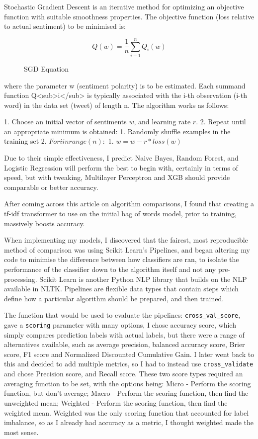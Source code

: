 \documentclass{article}
\begin{document}
Stochastic Gradient Descent is an iterative method for optimizing an objective function with suitable smoothness properties.
The objective function (loss relative to actual sentiment) to be minimised is:

\begin{figure}[H]
	\begin{equation}
		Q(w) = \frac{1}{n}\sum_{i-1}^{n}Q_i(w)
	\end{equation}
	\caption{SGD Equation}
\end{figure}

where the parameter w (sentiment polarity) is to be estimated.
Each summand function Q<sub>i</sub> is typically associated with the i-th observation (i-th word) in the data set (tweet) of length n.
The algorithm works as follows:

1.
Choose an initial vector of sentiments $w$, and learning rate $r$.
2.
Repeat until an appropriate minimum is obtained:
1.
Randomly shuffle examples in the training set
2.
$For i in range(n):$
1.
$w = w - r*loss(w)$

Due to their simple effectiveness, I predict Naive Bayes, Random Forest, and Logistic Regression will perform the best to begin with, certainly in terms of speed, but with tweaking, Multilayer Perceptron and XGB should provide comparable or better accuracy.

After coming across this article on algorithm comparisons, I found that creating a tf-idf transformer to use on the initial bag of words model, prior to training, massively boosts accuracy.

When implementing my models, I discovered that the fairest, most reproducible method of comparison was using Scikit Learn's Pipelines, and began altering my code to minimise the difference between how classifiers are ran, to isolate the performance of the classifier down to the algorithm itself and not any pre-processing.
Scikit Learn is another Python NLP library that builds on the NLP available in NLTK.
Pipelines are flexible data types that contain steps which define how a particular algorithm should be prepared, and then trained.

The function that would be used to evaluate the pipelines: \lstinline{cross_val_score}, gave a \lstinline{scoring} parameter with many options, I chose accuracy score, which simply compares prediction labels with actual labels, but there were a range of alternatives available, such as average precision, balanced accuracy score, Brier score, F1 score and Normalized Discounted Cumulative Gain.
I later went back to this and decided to add multiple metrics, so I had to instead use \lstinline{cross_validate} and chose Precision score, and Recall score.
These two score types required an averaging function to be set, with the options being: Micro - Perform the scoring function, but don't average; Macro - Perform the scoring function, then find the unweighted mean; Weighted - Perform the scoring function, then find the weighted mean.
Weighted was the only scoring function that accounted for label imbalance, so as I already had accuracy as a metric, I thought weighted made the most sense.
\end{document}

